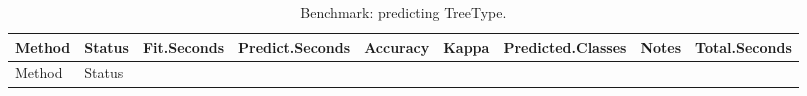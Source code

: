 \documentclass[
  11pt,
]{article}
\begin{document}
\begin{longtable}[]{@{}
  >{\raggedright\arraybackslash}p{}
  >{\raggedright\arraybackslash}p{}
  >{\raggedleft\arraybackslash}p{}
  >{\raggedleft\arraybackslash}p{}
  >{\raggedleft\arraybackslash}p{}
  >{\raggedleft\arraybackslash}p{}
  >{\raggedleft\arraybackslash}p{}
  >{\raggedright\arraybackslash}p{}
  >{\raggedleft\arraybackslash}p{}@{}}
\caption{Benchmark: predicting TreeType.}\tabularnewline
\toprule\noalign{}
\begin{minipage}[b]{\linewidth}\raggedright
Method
\end{minipage} & \begin{minipage}[b]{\linewidth}\raggedright
Status
\end{minipage} & \begin{minipage}[b]{\linewidth}\raggedleft
Fit.Seconds
\end{minipage} & \begin{minipage}[b]{\linewidth}\raggedleft
Predict.Seconds
\end{minipage} & \begin{minipage}[b]{\linewidth}\raggedleft
Accuracy
\end{minipage} & \begin{minipage}[b]{\linewidth}\raggedleft
Kappa
\end{minipage} & \begin{minipage}[b]{\linewidth}\raggedleft
Predicted.Classes
\end{minipage} & \begin{minipage}[b]{\linewidth}\raggedright
Notes
\end{minipage} & \begin{minipage}[b]{\linewidth}\raggedleft
Total.Seconds
\end{minipage} \\
\midrule\noalign{}
\endfirsthead
\toprule\noalign{}
\begin{minipage}[b]{\linewidth}\raggedright
Method
\end{minipage} & \begin{minipage}[b]{\linewidth}\raggedright
Status
\end{minipage} & \begin{minipage}[b]{\linewidth}\raggedleft

\end{minipage}
\end{longtable}
\end{document}
